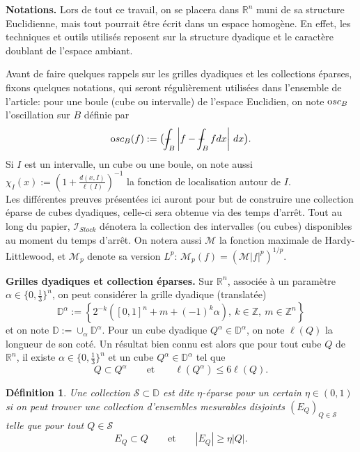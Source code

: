 \documentclass[11pt]{amsart}
\newtheorem{definition}[theorem]{D\'efinition}
\newcommand{\rr}{\mathbb}
\newcommand{\ii}{\mathscr}
\newcommand{\ic}{\mathcal}
\newcommand{\osc}{{\textrm osc}}
\newcommand{\Dy}{{\mathbb D}}
\def\Xint#1{\mathchoice
   {\XXint\displaystyle\textstyle{#1}}%
   {\XXint\textstyle\scriptstyle{#1}}%
   {\XXint\scriptstyle\scriptscriptstyle{#1}}%
   {\XXint\scriptscriptstyle\scriptscriptstyle{#1}}%
   \!\int}
\def\XXint#1#2#3{{\setbox0=\hbox{$#1{#2#3}{\int}$}
     \vcenter{\hbox{$#2#3$}}\kern-.5\wd0}}
\def\aver#1{\Xint-_{#1}}
\begin{document}
\large{ \bf Notations.}
Lors de tout ce travail, on se placera dans ${\rr R}^n$ muni de sa structure Euclidienne, mais tout pourrait \^etre \'ecrit dans un espace homog\`ene. En effet, les techniques et outils utilis\'es reposent sur la structure dyadique et le caract\`ere doublant de l'espace ambiant.

\smallskip

Avant de faire quelques rappels sur les grilles dyadiques et les collections \'eparses, fixons quelques notations, qui seront r\'eguli\`erement utilis\'ees dans l'ensemble de l'article:
pour une boule (cube ou intervalle) de l'espace Euclidien, on note $\osc_B$ l'oscillation sur $B$ d\'efinie par
$$ \osc_B(f):= \big(\aver{B} \left| f- \aver{B} f dx \right| \, dx \big).
$$
Si $I$ est un intervalle, un cube ou une boule, on note aussi 
$\chi_{I}(x) := \left(1+ \frac{d(x,I)}{\ell(I)}\right)^{-1}$ la fonction de localisation autour de $I$. \\
Les diff\'erentes preuves pr\'esent\'ees ici auront pour but de construire une collection \'eparse de cubes dyadiques, celle-ci sera obtenue via des temps d'arr\^et. Tout au long du papier, $\ii I_{Stock}$ d\'enotera la collection des intervalles (ou cubes) disponibles au moment du temps d'arr\^et.
On notera aussi ${\mathcal M}$ la fonction maximale de Hardy-Littlewood, et ${\mathcal M}_p$ denote sa version $L^p$: $\ic M_p (f)= \left(  \ic M \vert f \vert^p \right)^{1/p}$.

\medskip

\large{ \bf Grilles dyadiques et collection \'eparses.}
Sur ${\rr R}^n$, associ\'ee \`a un param\`etre $\alpha\in\{0,\frac{1}{3}\}^n$, on peut consid\'erer la grille dyadique (translat\'ee)
$$ \Dy^\alpha := \left\{2^{-k}\left([0,1]^n+m+(-1)^k\alpha\right), \ k\in {\mathbb Z},\ m\in{\mathbb Z}^n \right\}$$
et on note $\Dy:= \cup_\alpha \Dy^\alpha$.
Pour un cube dyadique $Q^\alpha \in \Dy^\alpha$, on note $\ell(Q)$ la longueur de son cot\'e. Un r\'esultat bien connu est alors que pour tout cube $Q$ de ${\rr R}^n$, il existe $\alpha\in\{0,\frac{1}{3}\}^n$ et un cube $Q^\alpha\in \Dy^\alpha$ tel que
$$ Q\subset Q^\alpha \qquad \textrm{et} \qquad \ell(Q^\alpha)\leq 6 \ell(Q).$$ 



\begin{definition}\label{def:sparse} Une collection ${\mathcal S} \subset \Dy$ est dite $\eta$-{\it \'eparse} pour un certain $\eta\in(0,1)$ si on peut trouver une collection d'ensembles mesurables disjoints $(E_Q)_{Q\in {\mathcal S}}$ telle que pour tout $Q\in {\mathcal S}$
$$ E_Q \subset Q \qquad \textrm{et} \qquad |E_Q|\geq \eta |Q|.$$
\end{definition}
\end{document}

